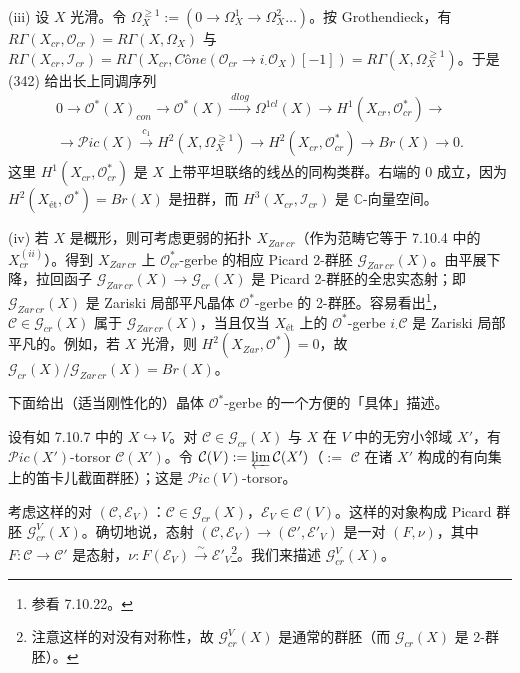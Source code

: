 (iii) 设 $X$ 光滑。令 $\Omega^{\geq1}_{X}:=(0\to\Omega^{1}_{X}\to\Omega^{2}_{X}\ldots)$。按 Grothendieck，有 $R\Gamma(X_{cr},\mathcal{O}_{cr})=R\Gamma(X,\Omega_{X})$ 与 $R\Gamma(X_{cr},\mathcal{I}_{cr})=R\Gamma(X_{cr},\mathit{Cône}(\mathcal{O}_{cr}\to i_{\cdot}\mathcal{O}_{X})[-1])=R\Gamma(X,\Omega^{\geq1}_{X})$。于是 (342) 给出长上同调序列
\[
\begin{gathered}
0\longrightarrow\mathcal{O}^{*}(X)_{con}\longrightarrow\mathcal{O}^{*}(X)\xrightarrow{\ dlog\ }\Omega^{1cl}(X)\longrightarrow H^{1}(X_{cr},\mathcal{O}^{*}_{cr})\longrightarrow\\
\longrightarrow\mathcal{P}ic(X)\xrightarrow{\ c_{1}\ }H^{2}(X,\Omega^{\geq1}_{X})\longrightarrow H^{2}(X_{cr},\mathcal{O}^{*}_{cr})\longrightarrow Br(X)\longrightarrow0.
\end{gathered}
\]
这里 $H^{1}(X_{cr},\mathcal{O}^{*}_{cr})$ 是 $X$ 上带平坦联络的线丛的同构类群。右端的 0 成立，因为 $H^{2}(X_{\text{ét}},\mathcal{O}^{*})=Br(X)$ 是扭群，而 $H^{3}(X_{cr},\mathcal{I}_{cr})$ 是 $\mathbb{C}$-向量空间。

(iv) 若 $X$ 是概形，则可考虑更弱的拓扑 $X_{Zar\,cr}$（作为范畴它等于 7.10.4 中的 $X^{(ii)}_{cr}$）。得到 $X_{Zar\,cr}$ 上 $\mathcal{O}^{*}_{cr}$-gerbe 的相应 Picard 2-群胚 $\mathcal{G}_{Zar\,cr}(X)$。由平展下降，拉回函子 $\mathcal{G}_{Zar\,cr}(X)\to\mathcal{G}_{cr}(X)$ 是 Picard 2-群胚的全忠实态射；即 $\mathcal{G}_{Zar\,cr}(X)$ 是 Zariski 局部平凡晶体 $\mathcal{O}^{*}$-gerbe 的 2-群胚。容易看出\footnote{参看 7.10.22。}，$\mathcal{C}\in\mathcal{G}_{cr}(X)$ 属于 $\mathcal{G}_{Zar\,cr}(X)$，当且仅当 $X_{\text{ét}}$ 上的 $\mathcal{O}^{*}$-gerbe $i_{\cdot}\mathcal{C}$ 是 Zariski 局部平凡的。例如，若 $X$ 光滑，则 $H^{2}(X_{Zar},\mathcal{O}^{*})=0$，故 $\mathcal{G}_{cr}(X)/\mathcal{G}_{Zar\,cr}(X)=Br(X)$。


 下面给出（适当刚性化的）晶体 $\mathcal{O}^{*}$-gerbe 的一个方便的「具体」描述。

设有如 7.10.7 中的 $X\hookrightarrow V$。对 $\mathcal{C}\in\mathcal{G}_{cr}(X)$ 与 $X$ 在 $V$ 中的无穷小邻域 $X'$，有 $\mathcal{P}ic(X')$-torsor $\mathcal{C}(X')$。令 $\mathcal{C}(V):=\varprojlim\mathcal{C}(X')$（$:=$ $\mathcal{C}$ 在诸 $X'$ 构成的有向集上的笛卡儿截面群胚）；这是 $\mathcal{P}ic(V)$-torsor。

考虑这样的对 $(\mathcal{C},\mathcal{E}_{V})$：$\mathcal{C}\in\mathcal{G}_{cr}(X)$，$\mathcal{E}_{V}\in\mathcal{C}(V)$。这样的对象构成 Picard 群胚 $\mathcal{G}^{V}_{cr}(X)$。确切地说，态射 $(\mathcal{C},\mathcal{E}_{V})\to(\mathcal{C}',\mathcal{E}'_{V})$ 是一对 $(F,\nu)$，其中 $F:\mathcal{C}\to\mathcal{C}'$ 是态射，$\nu:F(\mathcal{E}_{V})\xrightarrow{\sim}\mathcal{E}'_{V}$\footnote{注意这样的对没有对称性，故 $\mathcal{G}^{V}_{cr}(X)$ 是通常的群胚（而 $\mathcal{G}_{cr}(X)$ 是 2-群胚）。}。我们来描述 $\mathcal{G}^{V}_{cr}(X)$。


